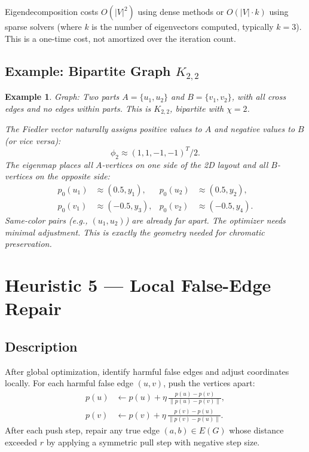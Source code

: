 \documentclass[11pt]{article}
\newtheorem{example}[theorem]{Example}
\begin{document}
Eigendecomposition costs $O(|V|^2)$ using dense methods or $O(|V| \cdot k)$ using
sparse solvers (where $k$ is the number of eigenvectors computed, typically
$k = 3$). This is a one-time cost, not amortized over the iteration count.

\subsection{Example: Bipartite Graph $K_{2,2}$}

\begin{example}
Graph: Two parts $A = \{u_1, u_2\}$ and $B = \{v_1, v_2\}$, with all cross
edges and no edges within parts. This is $K_{2,2}$, bipartite with $\chi = 2$.

The Fiedler vector naturally assigns positive values to $A$ and negative values
to $B$ (or vice versa):
\[
  \phi_2 \approx (1, 1, -1, -1)^T / 2.
\]
The eigenmap places all $A$-vertices on one side of the 2D layout and all
$B$-vertices on the opposite side:
\begin{align*}
  p_0(u_1) &\approx (0.5, y_1), & p_0(u_2) &\approx (0.5, y_2),\\
  p_0(v_1) &\approx (-0.5, y_3), & p_0(v_2) &\approx (-0.5, y_4).
\end{align*}
Same-color pairs (e.g., $(u_1, u_2)$) are already far apart. The optimizer
needs minimal adjustment. This is exactly the geometry needed for chromatic
preservation.
\end{example}

\newpage

\section{Heuristic 5 — Local False-Edge Repair}

\subsection{Description}

After global optimization, identify harmful false edges and adjust coordinates
locally. For each harmful false edge $(u,v)$, push the vertices apart:
\begin{align*}
  p(u) &\leftarrow p(u) + \eta\,\frac{p(u) - p(v)}{\|p(u) - p(v)\|},\\
  p(v) &\leftarrow p(v) + \eta\,\frac{p(v) - p(u)}{\|p(v) - p(u)\|}.
\end{align*}
After each push step, repair any true edge $(a,b) \in E(G)$ whose distance exceeded
$r$ by applying a symmetric pull step with negative step size.
\end{document}
